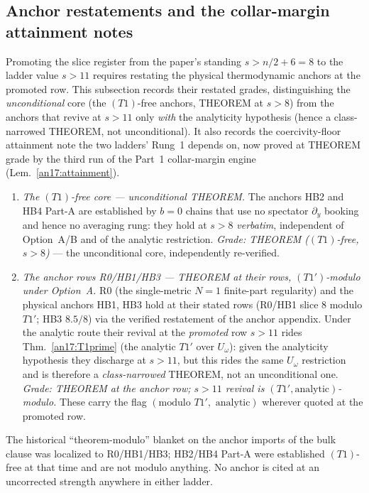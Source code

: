 \subsection{Anchor restatements and the collar-margin attainment
notes}\label{an17:sec-anchors}\label{sec:an17-consumer}%

Promoting the slice register from the paper's standing $s>n/2+6=8$ to the
ladder value $s>11$ requires restating the physical thermodynamic anchors at
the promoted row. This subsection records their restated grades, distinguishing
the \emph{unconditional} core (the $(T1)$-free anchors, THEOREM at $s>8$) from
the anchors that revive at $s>11$ only \emph{with} the analyticity hypothesis
(hence a class-narrowed THEOREM, not unconditional). It also records the
coercivity-floor attainment note the two ladders' Rung~1 depends on, now
proved at THEOREM grade by the third run of the Part~1 collar-margin
engine (Lem.~\ref{an17:attainment}).

\begin{remark}\label{an17:anchors}
\begin{enumerate}[label=\textup{(\alph*)},leftmargin=*,nosep]
\item \emph{The $(T1)$-free core --- unconditional THEOREM.} The anchors HB2 and
  HB4 Part-A are established by $b=0$ chains that use no spectator
  $\partial_y$ booking and hence no averaging rung: they hold at $s>8$
  \emph{verbatim}, independent of Option~A/B and of the analytic restriction.
  \emph{Grade: THEOREM ($(T1)$-free, $s>8$)} --- the unconditional core, independently
  re-verified.
\item \emph{The anchor rows R0/HB1/HB3 --- THEOREM at their rows, $(T1')$-modulo
  under Option~A.} R0 (the single-metric $N{=}1$ finite-part regularity) and the
  physical anchors HB1, HB3 hold at their stated rows (R0/HB1 slice $8$
  modulo $T1'$; HB3 $8.5/8$) via the verified restatement of the
  anchor appendix. Under the analytic route their revival at the \emph{promoted}
  row $s>11$ rides Thm.~\ref{an17:T1prime} (the analytic $T1'$ over $U_\omega$):
  given the analyticity hypothesis they discharge at $s>11$, but this rides the
  same $U_\omega$ restriction and is therefore a \emph{class-narrowed} THEOREM,
  not an unconditional one. \emph{Grade: THEOREM at the anchor row; $s>11$
  revival is $(T1',\text{analytic})$-modulo.} These carry the flag
  $(\text{modulo }T1',\text{ analytic})$ wherever quoted at the promoted row.
\end{enumerate}
The historical ``theorem-modulo'' blanket on the anchor imports of the
bulk clause was localized to R0/HB1/HB3; HB2/HB4 Part-A were
established $(T1)$-free at that time and are not modulo anything. No anchor is
cited at an uncorrected strength anywhere in either ladder.
\end{remark}

